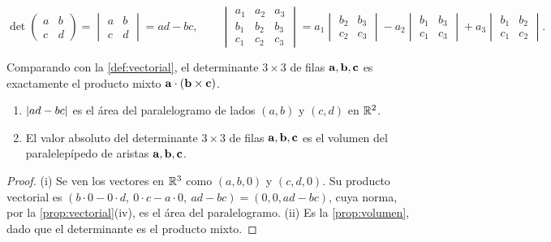 \begin{definicion}[Determinantes]\label{def:det3}
\[
\det\begin{pmatrix}a&b\\c&d\end{pmatrix}=\begin{vmatrix}a&b\\c&d\end{vmatrix}=ad-bc,
\qquad
\begin{vmatrix}a_1&a_2&a_3\\b_1&b_2&b_3\\c_1&c_2&c_3\end{vmatrix}
=a_1\begin{vmatrix}b_2&b_3\\c_2&c_3\end{vmatrix}-a_2\begin{vmatrix}b_1&b_3\\c_1&c_3\end{vmatrix}+a_3\begin{vmatrix}b_1&b_2\\c_1&c_2\end{vmatrix}.
\]
\end{definicion}

Comparando con la \cref{def:vectorial}, el determinante $3\times3$ de filas $\mathbf{a},\mathbf{b},\mathbf c$ es exactamente el producto mixto $\mathbf{a}\cdot(\mathbf{b}\times\mathbf c)$.

\begin{teorema}\label{teo:det-area}
\begin{enumerate}
  \item $\lvert ad-bc\rvert$ es el área del paralelogramo de lados $(a,b)$ y $(c,d)$ en $\mathbb{R}^2$.
  \item El valor absoluto del determinante $3\times3$ de filas $\mathbf{a},\mathbf{b},\mathbf c$ es el volumen del paralelepípedo de aristas $\mathbf{a},\mathbf{b},\mathbf c$.
\end{enumerate}
\end{teorema}

\begin{proof}
(i) Se ven los vectores en $\mathbb{R}^3$ como $(a,b,0)$ y $(c,d,0)$. Su producto vectorial es $(b\cdot0-0\cdot d,\ 0\cdot c-a\cdot0,\ ad-bc)=(0,0,ad-bc)$, cuya norma, por la \cref{prop:vectorial}(iv), es el área del paralelogramo. (ii) Es la \cref{prop:volumen}, dado que el determinante es el producto mixto.
\end{proof}

